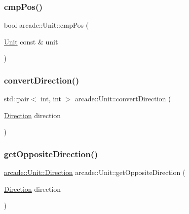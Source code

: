 \subsubsection{\texorpdfstring{cmp\+Pos()}{cmpPos()}}
{\footnotesize\ttfamily bool arcade\+::\+Unit\+::cmp\+Pos (\begin{DoxyParamCaption}\item[{\hyperlink{classarcade_1_1_unit}{Unit} const \&}]{unit }\end{DoxyParamCaption})}

\mbox{\label{classarcade_1_1_unit_ada89038fcb7152ea19e2639e1bbc58ea}} 
\subsubsection{\texorpdfstring{convert\+Direction()}{convertDirection()}}
{\footnotesize\ttfamily std\+::pair$<$ int, int $>$ arcade\+::\+Unit\+::convert\+Direction (\begin{DoxyParamCaption}\item[{\hyperlink{classarcade_1_1_unit_af418afeaba1f7fd5934b6ae1343215dd}{Direction}}]{direction }\end{DoxyParamCaption})}

\mbox{\label{classarcade_1_1_unit_aa1a289e46e53c2c9bf7d80ef5571d08f}} 
\subsubsection{\texorpdfstring{get\+Opposite\+Direction()}{getOppositeDirection()}}
{\footnotesize\ttfamily \hyperlink{classarcade_1_1_unit_af418afeaba1f7fd5934b6ae1343215dd}{arcade\+::\+Unit\+::\+Direction} arcade\+::\+Unit\+::get\+Opposite\+Direction (\begin{DoxyParamCaption}\item[{\hyperlink{classarcade_1_1_unit_af418afeaba1f7fd5934b6ae1343215dd}{Direction}}]{direction }\end{DoxyParamCaption})}

\mbox{\label{classarcade_1_1_unit_a6ab43e77e961dc4192687ea730dd7712}} 
